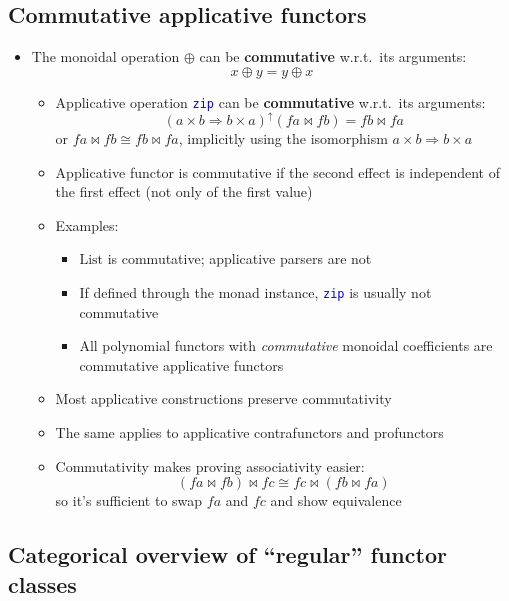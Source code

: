 \subsection{Commutative applicative functors}
\begin{itemize}
\item \vspace{-0.15cm}The monoidal operation $\oplus$ can be \textbf{commutative}
w.r.t.\ its arguments:{\footnotesize{}
\[
x\oplus y=y\oplus x
\]
}{\footnotesize\par}
\begin{itemize}
\item Applicative operation \texttt{\textcolor{blue}{\footnotesize{}zip}}
can be \textbf{commutative} w.r.t.\ its arguments:{\footnotesize{}
\[
\left(a\times b\Rightarrow b\times a\right)^{\uparrow}\left(fa\bowtie fb\right)=fb\bowtie fa
\]
}or $fa\bowtie fb\cong fb\bowtie fa$, implicitly using the isomorphism
$a\times b\Rightarrow b\times a$
\item Applicative functor is commutative if the second effect is independent
of the first effect (not only of the first value)
\item Examples:
\begin{itemize}
\item $\text{List}$ is commutative; applicative parsers are not
\item If defined through the monad instance, \texttt{\textcolor{blue}{\footnotesize{}zip}}
is usually not commutative
\item All polynomial functors with \emph{commutative} monoidal coefficients
are commutative applicative functors 
\end{itemize}
\item Most applicative constructions preserve commutativity 
\item The same applies to applicative contrafunctors and profunctors 
\item Commutativity makes proving associativity easier: {\footnotesize{}
\[
\left(fa\bowtie fb\right)\bowtie fc\cong fc\bowtie\left(fb\bowtie fa\right)
\]
}so it's sufficient to swap $fa$ and $fc$ and show equivalence
\end{itemize}
\end{itemize}


\subsection{Categorical overview of ``regular'' functor classes}

